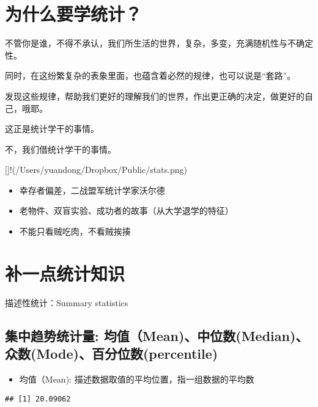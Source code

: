\documentclass[]{book}
\newenvironment{Shaded}{\begin{snugshade}}{\end{snugshade}}
\newcommand{\KeywordTok}[1]{\textcolor[rgb]{0.13,0.29,0.53}{\textbf{#1}}}
\newcommand{\NormalTok}[1]{#1}
\newcommand{\OperatorTok}[1]{\textcolor[rgb]{0.81,0.36,0.00}{\textbf{#1}}}
\providecommand{\tightlist}{%
  \setlength{\itemsep}{0pt}\setlength{\parskip}{0pt}}
\begin{document}
\section{为什么要学统计？}

不管你是谁，不得不承认，我们所生活的世界，复杂，多变，充满随机性与不确定性。

同时，在这纷繁复杂的表象里面，也蕴含着必然的规律，也可以说是``套路''。

发现这些规律，帮助我们更好的理解我们的世界，作出更正确的决定，做更好的自己，哦耶。

这正是统计学干的事情。

不，我们借统计学干的事情。

{[}{]}!(/Users/yuandong/Dropbox/Public/stats.png)

\begin{itemize}
\tightlist
\item
  幸存者偏差，二战盟军统计学家沃尔德
\item
  老物件、双盲实验、成功者的故事（从大学退学的特征）
\item
  不能只看贼吃肉，不看贼挨揍
\end{itemize}

\section{补一点统计知识}

描述性统计：Summary statistics

\hypertarget{-meanmedianmodepercentile}{%
\subsection{集中趋势统计量:
均值（Mean)、中位数(Median)、众数(Mode)、百分位数(percentile)}\label{-meanmedianmodepercentile}}

\begin{itemize}
\tightlist
\item
  均值（Mean): 描述数据取值的平均位置，指一组数据的平均数
\end{itemize}

\begin{Shaded}
\end{Shaded}

\begin{verbatim}
## [1] 20.09062
\end{verbatim}
\end{document}
